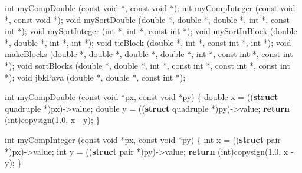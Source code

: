 \documentclass[12pt,]{article}
\newenvironment{Shaded}{\begin{snugshade}}{\end{snugshade}}
\newcommand{\KeywordTok}[1]{\textcolor[rgb]{0.13,0.29,0.53}{\textbf{{#1}}}}
\newcommand{\DataTypeTok}[1]{\textcolor[rgb]{0.13,0.29,0.53}{{#1}}}
\newcommand{\FloatTok}[1]{\textcolor[rgb]{0.00,0.00,0.81}{{#1}}}
\newcommand{\NormalTok}[1]{{#1}}
\begin{document}
\begin{Shaded}
\begin{Highlighting}[]
\DataTypeTok{int} \NormalTok{myCompDouble (}\DataTypeTok{const} \DataTypeTok{void} \NormalTok{*, }\DataTypeTok{const} \DataTypeTok{void} \NormalTok{*);}
\DataTypeTok{int} \NormalTok{myCompInteger (}\DataTypeTok{const} \DataTypeTok{void} \NormalTok{*, }\DataTypeTok{const} \DataTypeTok{void} \NormalTok{*);}
\DataTypeTok{void} \NormalTok{mySortDouble (}\DataTypeTok{double} \NormalTok{*, }\DataTypeTok{double} \NormalTok{*, }\DataTypeTok{double} \NormalTok{*, }\DataTypeTok{int} \NormalTok{*, }\DataTypeTok{const} \DataTypeTok{int} \NormalTok{*);}
\DataTypeTok{void} \NormalTok{mySortInteger (}\DataTypeTok{int} \NormalTok{*, }\DataTypeTok{int} \NormalTok{*, }\DataTypeTok{const} \DataTypeTok{int} \NormalTok{*);}
\DataTypeTok{void} \NormalTok{mySortInBlock (}\DataTypeTok{double} \NormalTok{*, }\DataTypeTok{double} \NormalTok{*, }\DataTypeTok{int} \NormalTok{*, }\DataTypeTok{int} \NormalTok{*);}
\DataTypeTok{void} \NormalTok{tieBlock (}\DataTypeTok{double} \NormalTok{*, }\DataTypeTok{int} \NormalTok{*, }\DataTypeTok{const} \DataTypeTok{int} \NormalTok{*, }\DataTypeTok{int} \NormalTok{*);}
\DataTypeTok{void} \NormalTok{makeBlocks (}\DataTypeTok{double} \NormalTok{*, }\DataTypeTok{double} \NormalTok{*, }\DataTypeTok{double} \NormalTok{*, }\DataTypeTok{double} \NormalTok{*, }\DataTypeTok{int} \NormalTok{*, }\DataTypeTok{const} \DataTypeTok{int} \NormalTok{*, }\DataTypeTok{const} \DataTypeTok{int} \NormalTok{*);}
\DataTypeTok{void} \NormalTok{sortBlocks (}\DataTypeTok{double} \NormalTok{*, }\DataTypeTok{double} \NormalTok{*, }\DataTypeTok{int} \NormalTok{*, }\DataTypeTok{const} \DataTypeTok{int} \NormalTok{*, }\DataTypeTok{const} \DataTypeTok{int} \NormalTok{*, }\DataTypeTok{const} \DataTypeTok{int} \NormalTok{*);}
\DataTypeTok{void} \NormalTok{jbkPava (}\DataTypeTok{double} \NormalTok{*, }\DataTypeTok{double} \NormalTok{*, }\DataTypeTok{const} \DataTypeTok{int} \NormalTok{*);}

\DataTypeTok{int} \NormalTok{myCompDouble (}\DataTypeTok{const} \DataTypeTok{void} \NormalTok{*px, }\DataTypeTok{const} \DataTypeTok{void} \NormalTok{*py) \{}
    \DataTypeTok{double} \NormalTok{x = ((}\KeywordTok{struct} \NormalTok{quadruple *)px)->value;}
    \DataTypeTok{double} \NormalTok{y = ((}\KeywordTok{struct} \NormalTok{quadruple *)py)->value;}
    \KeywordTok{return} \NormalTok{(}\DataTypeTok{int}\NormalTok{)copysign(}\FloatTok{1.0}\NormalTok{, x - y);}
\NormalTok{\}}

\DataTypeTok{int} \NormalTok{myCompInteger (}\DataTypeTok{const} \DataTypeTok{void} \NormalTok{*px, }\DataTypeTok{const} \DataTypeTok{void} \NormalTok{*py) \{}
    \DataTypeTok{int} \NormalTok{x = ((}\KeywordTok{struct} \NormalTok{pair *)px)->value;}
    \DataTypeTok{int} \NormalTok{y = ((}\KeywordTok{struct} \NormalTok{pair *)py)->value;}
    \KeywordTok{return} \NormalTok{(}\DataTypeTok{int}\NormalTok{)copysign(}\FloatTok{1.0}\NormalTok{, x - y);}
\NormalTok{\}}


\end{Highlighting}
\end{Shaded}
\end{document}
